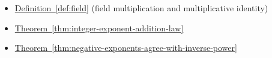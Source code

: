 \begin{dependencies}
\begin{itemize}
  \item \hyperref[def:field]{Definition~\ref*{def:field}}
        \textnormal{(field multiplication and multiplicative identity)}
  \item \hyperref[thm:integer-exponent-addition-law]{Theorem~\ref*{thm:integer-exponent-addition-law}}
  \item \hyperref[thm:negative-exponents-agree-with-inverse-power]{Theorem~\ref*{thm:negative-exponents-agree-with-inverse-power}}
\end{itemize}
\end{dependencies}

\clearpage
